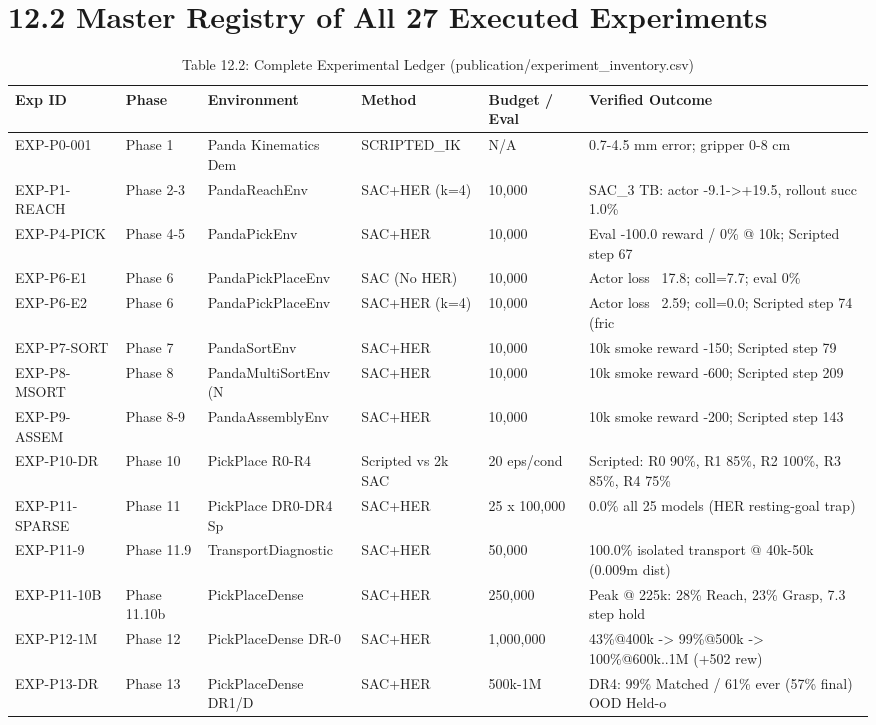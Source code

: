 \documentclass[11pt,a4paper,oneside]{book}
\begin{document}
\section{12.2 Master Registry of All 27 Executed Experiments}
\begin{longtable}{l l l l l l}\caption{Table 12.2: Complete Experimental Ledger (publication/experiment\_inventory.csv)}\\\toprule
Exp ID & Phase & Environment & Method & Budget / Eval & Verified Outcome \\ \midrule \endhead
EXP-P0-001 & Phase 1 & Panda Kinematics Dem & SCRIPTED\_IK & N/A & 0.7-4.5 mm error; gripper 0-8 cm \\
EXP-P1-REACH & Phase 2-3 & PandaReachEnv & SAC+HER (k=4) & 10,000 & SAC\_3 TB: actor -9.1->+19.5, rollout succ 1.0\% \\
EXP-P4-PICK & Phase 4-5 & PandaPickEnv & SAC+HER & 10,000 & Eval -100.0 reward / 0\% @ 10k; Scripted step 67 \\
EXP-P6-E1 & Phase 6 & PandaPickPlaceEnv & SAC (No HER) & 10,000 & Actor loss ~17.8; coll=7.7; eval 0\% \\
EXP-P6-E2 & Phase 6 & PandaPickPlaceEnv & SAC+HER (k=4) & 10,000 & Actor loss ~2.59; coll=0.0; Scripted step 74 (fric \\
EXP-P7-SORT & Phase 7 & PandaSortEnv & SAC+HER & 10,000 & 10k smoke reward -150; Scripted step 79 \\
EXP-P8-MSORT & Phase 8 & PandaMultiSortEnv (N & SAC+HER & 10,000 & 10k smoke reward -600; Scripted step 209 \\
EXP-P9-ASSEM & Phase 8-9 & PandaAssemblyEnv & SAC+HER & 10,000 & 10k smoke reward -200; Scripted step 143 \\
EXP-P10-DR & Phase 10 & PickPlace R0-R4 & Scripted vs 2k SAC & 20 eps/cond & Scripted: R0 90\%, R1 85\%, R2 100\%, R3 85\%, R4 75\% \\
EXP-P11-SPARSE & Phase 11 & PickPlace DR0-DR4 Sp & SAC+HER & 25 x 100,000 & 0.0\% all 25 models (HER resting-goal trap) \\
EXP-P11-9 & Phase 11.9 & TransportDiagnostic & SAC+HER & 50,000 & 100.0\% isolated transport @ 40k-50k (0.009m dist) \\
EXP-P11-10B & Phase 11.10b & PickPlaceDense & SAC+HER & 250,000 & Peak @ 225k: 28\% Reach, 23\% Grasp, 7.3 step hold \\
EXP-P12-1M & Phase 12 & PickPlaceDense DR-0 & SAC+HER & 1,000,000 & 43\%@400k -> 99\%@500k -> 100\%@600k..1M (+502 rew) \\
EXP-P13-DR & Phase 13 & PickPlaceDense DR1/D & SAC+HER & 500k-1M & DR4: 99\% Matched / 61\% ever (57\% final) OOD Held-o \\

\end{longtable}
\end{document}
